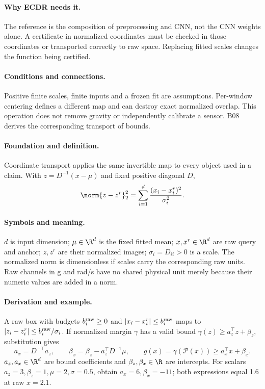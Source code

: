 \paragraph{Why ECDR needs it.}
The reference is the composition of preprocessing and CNN, not the CNN
weights alone. A certificate in normalized coordinates must be checked in
those coordinates or transported correctly to raw space. Replacing fitted
scales changes the function being certified.
\paragraph{Conditions and connections.}
Positive finite scales, finite inputs and a frozen fit are assumptions.
Per-window centering defines a different map and can destroy exact
normalized overlap. This operation does not remove gravity or independently
calibrate a sensor. B08 derives the corresponding transport of bounds.

\paragraph{Foundation and definition.}
Coordinate transport applies the same invertible map to every object used
in a claim. With $z=D^{-1}(x-\mu)$ and fixed positive diagonal $D$,
\[
 \norm{z-z^r}_2^2=\sum_{i=1}^{d}\frac{(x_i-x_i^r)^2}{\sigma_i^2}.
\]
\paragraph{Symbols and meaning.}
$d$ is input dimension; $\mu\in\R^d$ is the fixed fitted mean;
$x,x^r\in\R^d$ are raw query and anchor;
$z,z^r$ are their normalized images; $\sigma_i=D_{ii}>0$ is a scale.
The normalized norm is dimensionless if scales carry the corresponding
raw units. Raw channels in g and rad/s have no shared physical unit merely
because their numeric values are added in a norm.
\paragraph{Derivation and example.}
A raw box with budgets $b_i^{\rm raw}\ge0$ and $|x_i-x_i^r|\le b_i^{\rm raw}$ maps to
$|z_i-z_i^r|\le b_i^{\rm raw}/\sigma_i$. If normalized margin
$\gamma$ has a valid bound $\gamma(z)\ge a_z^\top z+\beta_z$, substitution gives
\[
 a_x=D^{-\top}a_z,\qquad
 \beta_x=\beta_z-a_z^\top D^{-1}\mu,
 \qquad g(x)=\gamma(\mathcal P(x))\ge a_x^\top x+\beta_x.
\]
$a_z,a_x\in\R^d$ are bound coefficients and $\beta_z,\beta_x\in\R$ are
intercepts. For scalars $a_z=3,\beta_z=1,\mu=2,\sigma=0.5$, obtain
$a_x=6,\beta_x=-11$; both expressions equal 1.6 at raw $x=2.1$.
